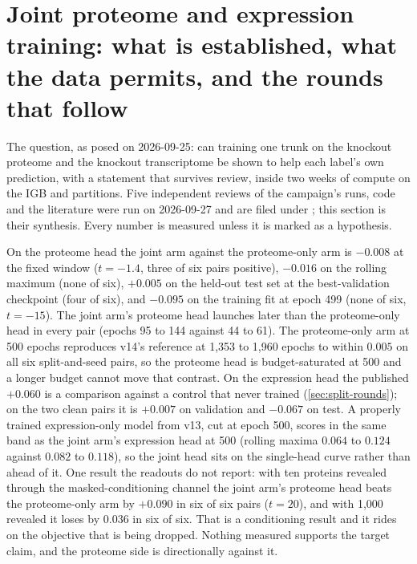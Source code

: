 
\section{Joint proteome and expression training: what is established, what the data permits, and the rounds that follow}
\label{sec:joint-plan}

The question, as posed on 2026-09-25: can training one trunk on the knockout proteome and
the knockout transcriptome be shown to help each label's own prediction, with a statement
that survives review, inside two weeks of compute on the IGB  and 
partitions. Five independent reviews of the campaign's runs, code and the literature were
run on 2026-09-27 and are filed under ; this section
is their synthesis. Every number is measured unless it is marked as a hypothesis.

 On the proteome head the joint arm against the
proteome-only arm is $-0.008$ at the fixed window ($t = -1.4$, three of six pairs positive),
$-0.016$ on the rolling maximum (none of six), $+0.005$ on the held-out test set at the
best-validation checkpoint (four of six), and $-0.095$ on the training fit at epoch 499
(none of six, $t = -15$). The joint arm's proteome head launches later than the
proteome-only head in every pair (epochs 95 to 144 against 44 to 61). The proteome-only arm
at 500 epochs reproduces v14's reference at 1,353 to 1,960 epochs to within $0.005$ on all
six split-and-seed pairs, so the proteome head is budget-saturated at 500 and a longer budget
cannot move that contrast. On the expression head the published $+0.060$ is a comparison
against a control that never trained (\cref{sec:split-rounds}); on the two clean pairs it is
$+0.007$ on validation and $-0.067$ on test. A properly trained expression-only model from
v13, cut at epoch 500, scores in the same band as the joint arm's expression head at 500
(rolling maxima $0.064$ to $0.124$ against $0.082$ to $0.118$), so the joint head sits on the
single-head curve rather than ahead of it. One result the readouts do not report: with ten
proteins revealed through the masked-conditioning channel the joint arm's proteome head beats
the proteome-only arm by $+0.090$ in six of six pairs ($t = 20$), and with 1,000 revealed it
loses by $0.036$ in six of six. That is a conditioning result and it rides on the objective
that is being dropped. Nothing measured supports the target claim, and the proteome side is
directionally against it.

